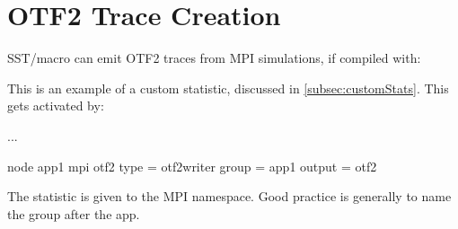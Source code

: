 
\section{OTF2 Trace Creation}
\label{sec:otf:traceEmission}
SST/macro can emit OTF2 traces from MPI simulations, if compiled with:

 
This is an example of a custom statistic, discussed in \ref{subsec:customStats}.
This gets activated by:

\begin{ViFile}
...

node {
 app1 {
  mpi {
    otf2 {
      type = otf2writer
      group = app1
      output = otf2
    }
  }
 }
}
\end{ViFile}

The statistic is given to the MPI namespace.
Good practice is generally to name the group after the app.


